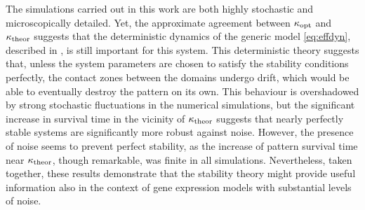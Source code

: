 \documentclass[a4paper,10pt]{article}
\newcommand{\TODO}[1]{\textcolor{blue}{\textbf{($\bigstar$ #1)}}}
\begin{document}
The simulations carried out in this work are both highly stochastic and microscopically detailed. Yet, the approximate agreement between $\kappa_{\rm opt}$ and $\kappa_{\rm theor}$ suggests that the deterministic dynamics of the generic model \eqref{eq:effdyn}, described in \cite{Majka2023}, is still important for this system. This deterministic theory suggests that, unless the system parameters are chosen to satisfy the stability conditions perfectly, the contact zones between the domains undergo drift, which would be able to eventually destroy the pattern on its own. This behaviour is overshadowed by strong stochastic fluctuations in the numerical simulations, but the significant increase in survival time in the vicinity of $\kappa_{\rm theor}$ suggests that nearly perfectly stable systems are significantly more robust against noise. However, the presence of noise seems to prevent perfect stability, as the increase of pattern survival time near $\kappa_{\rm theor}$, though remarkable, was finite in all simulations. Nevertheless, taken together, these results demonstrate that the stability theory might provide useful information also in the context of gene expression models with substantial levels of noise.


\end{document}
